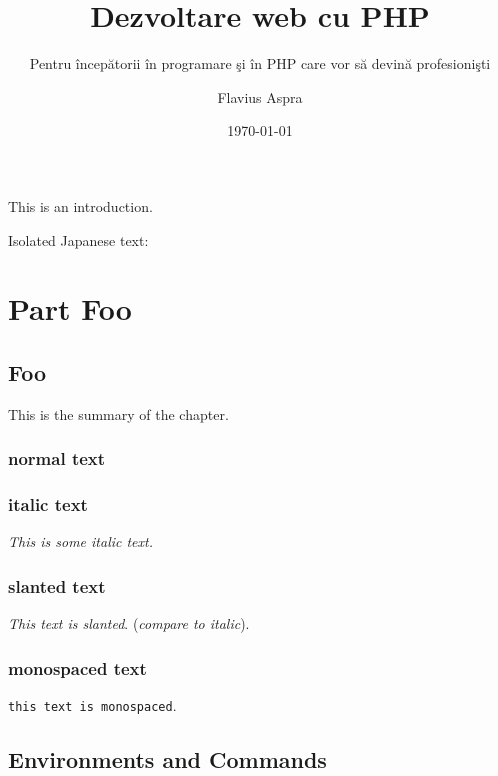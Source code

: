 \documentclass[a4paper,12pt,fleqn,twoside,openright,titlepagestyle=phpro]{yapbook}
\title{Dezvoltare web cu PHP}
\subtitle{Pentru începătorii în programare şi în PHP care vor să devină profesionişti}
\author{Flavius Aspra}
\date{\today}
\begin{document}
\frontmatter

    \maketitle

    \tableofcontents


        This is an introduction.

        Isolated Japanese text: 

\mainmatter

    \part{Part Foo}

        \chapter{Foo}
            \begin{chapsummary}
            This is the summary
            of the chapter.

            \lipsum[1]

            \end{chapsummary}

            \lipsum[1]

            \section{normal text}

            \section{italic text}
            \textit{This is some italic text.}

            \section{slanted text}
            \textsl{This text is slanted}. (\textit{compare to italic}).

            \section{monospaced text}
            \texttt{this text is monospaced}.

        \chapter{Environments and Commands}
\end{document}
